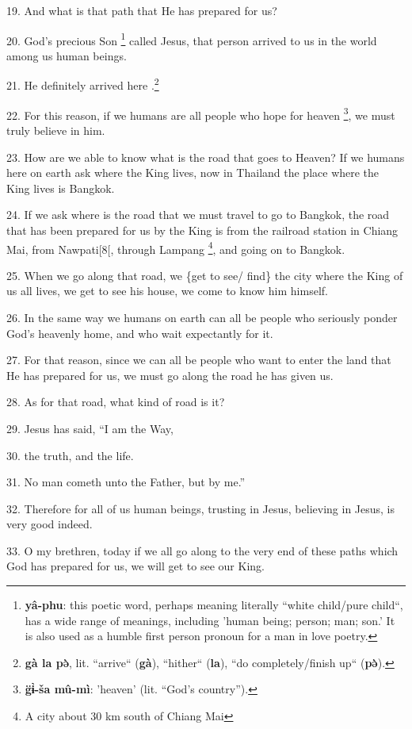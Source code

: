 19. And what is that path that He has prepared for us?

20. God's precious Son \footnote{\textbf{yâ-phu}: this poetic word, perhaps meaning literally ``white child/pure child``, has a wide range of meanings, including 'human being; person; man; son.' It is also used as a humble first person pronoun for a man in love poetry.} called Jesus, that person arrived to us in the world
among us human beings.

21. He definitely arrived here .\footnote{\textbf{gà  la  pə̀}, lit. ``arrive`` (\textbf{gà}), ``hither`` (\textbf{la}), ``do completely/finish up`` (\textbf{pə̀}).}

22. For this reason, if we humans are all people who hope for heaven \footnote{\textbf{g̈ɨ̀-ša mû-mì}: 'heaven' (lit. ``God's country'').}, we must
truly believe in him.

23. How are we able to know what is the road that goes to Heaven? If we  humans
here on earth ask where the King lives, now in Thailand the place where the King
lives is Bangkok.

24. If we ask where is the road that we must travel to go to Bangkok, the road
that has been prepared for us by the King is from the railroad station in Chiang
Mai, from Nawpati[8[, through Lampang \footnote{A city about 30 km south of Chiang Mai}, and going on to Bangkok.

25. When we go along that road, we \{get to see/ find\} the city where the King
of us all lives, we get to see his house, we come to know him himself.

26. In the same way we humans on earth can all be people who seriously ponder God's
heavenly home, and who wait expectantly for it.

27. For that reason, since we can all be people who want to enter the land that
He has prepared for us, we must go along the road he has given us.

28. As for that road, what kind of road is it?

29. Jesus has said, ``I am the Way,

30. the truth, and the life.

31. No man cometh unto the Father, but by me.''

32. Therefore for all of us human beings, trusting in Jesus, believing in Jesus,
is very good indeed.

33. O my brethren, today if we all go along to the very end of these paths which
God has prepared for us, we will get to see our King.


